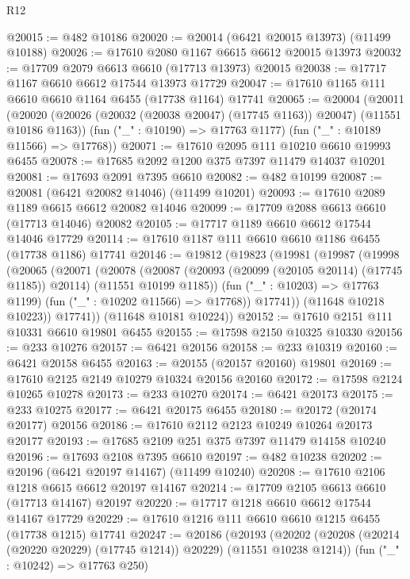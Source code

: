 \begin{lexlean}{R12}
\begin{coremodule}
{{{{{{{{{{{{{{{{{{{{{{{{{{{{{{{{{{{{{{{{{{{{{{{{{{{{{{{{{{{{{{{{{{{{{{{{{{{{{{{{{{@20015 := @482 @10186
@20020 := @20014 (@6421 @20015 @13973) (@11499 @10188)
@20026 := @17610 @2080 @1167 @6615 @6612 @20015 @13973
@20032 := @17709 @2079 @6613 @6610 (@17713 @13973) @20015
@20038 := @17717 @1167 @6610 @6612 @17544 @13973 @17729
@20047 := @17610 @1165 @111 @6610 @6610 @1164 @6455 (@17738 @1164) @17741
@20065 := @20004
    (@20011
      (@20020 (@20026 (@20032 (@20038 @20047) (@17745 @1163)) @20047) (@11551 @10186 @1163))
      (fun ("_" : @10190) => @17763 @1177)
      (fun ("_" : @10189 @11566) => @17768))
@20071 := @17610 @2095 @111 @10210 @6610 @19993 @6455
@20078 := @17685 @2092 @1200 @375 @7397 @11479 @14037 @10201
@20081 := @17693 @2091 @7395 @6610
@20082 := @482 @10199
@20087 := @20081 (@6421 @20082 @14046) (@11499 @10201)
@20093 := @17610 @2089 @1189 @6615 @6612 @20082 @14046
@20099 := @17709 @2088 @6613 @6610 (@17713 @14046) @20082
@20105 := @17717 @1189 @6610 @6612 @17544 @14046 @17729
@20114 := @17610 @1187 @111 @6610 @6610 @1186 @6455 (@17738 @1186) @17741
@20146 := @19812
    (@19823
      (@19981
        (@19987
          (@19998
            (@20065
              (@20071
                (@20078
                  (@20087
                    (@20093 (@20099 (@20105 @20114) (@17745 @1185)) @20114)
                    (@11551 @10199 @1185))
                  (fun ("_" : @10203) => @17763 @1199)
                  (fun ("_" : @10202 @11566) => @17768))
                @17741))
            (@11648 @10218 @10223))
          @17741))
      (@11648 @10181 @10224))
@20152 := @17610 @2151 @111 @10331 @6610 @19801 @6455
@20155 := @17598 @2150 @10325 @10330
@20156 := @233 @10276
@20157 := @6421 @20156
@20158 := @233 @10319
@20160 := @6421 @20158 @6455
@20163 := @20155 (@20157 @20160) @19801
@20169 := @17610 @2125 @2149 @10279 @10324 @20156 @20160
@20172 := @17598 @2124 @10265 @10278
@20173 := @233 @10270
@20174 := @6421 @20173
@20175 := @233 @10275
@20177 := @6421 @20175 @6455
@20180 := @20172 (@20174 @20177) @20156
@20186 := @17610 @2112 @2123 @10249 @10264 @20173 @20177
@20193 := @17685 @2109 @251 @375 @7397 @11479 @14158 @10240
@20196 := @17693 @2108 @7395 @6610
@20197 := @482 @10238
@20202 := @20196 (@6421 @20197 @14167) (@11499 @10240)
@20208 := @17610 @2106 @1218 @6615 @6612 @20197 @14167
@20214 := @17709 @2105 @6613 @6610 (@17713 @14167) @20197
@20220 := @17717 @1218 @6610 @6612 @17544 @14167 @17729
@20229 := @17610 @1216 @111 @6610 @6610 @1215 @6455 (@17738 @1215) @17741
@20247 := @20186
    (@20193
      (@20202 (@20208 (@20214 (@20220 @20229) (@17745 @1214)) @20229) (@11551 @10238 @1214))
      (fun ("_" : @10242) => @17763 @250)
}}}}}}}}}}}}}}}}}}}}}}}}}}}}}}}}}}}}}}}}}}}}}}}}}}}}}}}}}}}}}}}}}}}}}}}}}}}}}}}}}}
\end{coremodule}
\end{lexlean}
